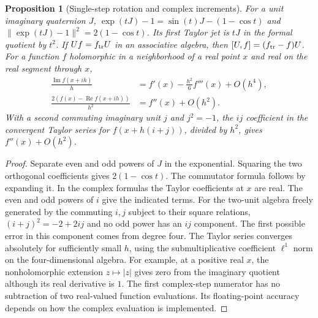 \documentclass[11pt,reqno]{amsart}
\newtheorem{proposition}[theorem]{Proposition}
\theoremstyle{definition}
\theoremstyle{remark}
\numberwithin{equation}{section}
\begin{document}
\begin{proposition}[Single-step rotation and complex increments]\label{m8:complex-step}
For a unit imaginary quaternion $J$,
$\exp(tJ)-1=\sin(t)J-(1-\cos t)$ and
$\|\exp(tJ)-1\|^2=2(1-\cos t)$. Its first Taylor jet is $tJ$
in the formal quotient by $t^2$. If $U f=f_{\rm tr}U$ in an
associative algebra, then $[U,f]=(f_{\rm tr}-f)U$.
For a function $f$ holomorphic in a neighborhood of a real point
$x$ and real on the real segment through $x$,
\begin{align*}
 \frac{\operatorname{Im}f(x+ih)}{h}
     &=f'(x)-\frac{h^2}{6}f'''(x)+O(h^4),\\
 \frac{2(f(x)-\operatorname{Re}f(x+ih))}{h^2}
     &=f''(x)+O(h^2).
\end{align*}
With a second commuting imaginary unit $j$ and $j^2=-1$,
the $ij$ coefficient in the convergent Taylor series for
$f(x+h(i+j))$, divided by $h^2$, gives $f''(x)+O(h^2)$.
\end{proposition}
\begin{proof}
Separate even and odd powers of $J$ in the exponential. Squaring
the two orthogonal coefficients gives $2(1-\cos t)$. The
commutator formula follows by expanding it. In the complex formulas
the Taylor coefficients at $x$ are real. The even and odd powers of
$i$ give the indicated terms. For the two-unit algebra freely
generated by the commuting $i,j$ subject to their square relations,
$(i+j)^2=-2+2ij$ and no odd power has an $ij$ component.
The first possible error in this component comes from degree four.
The Taylor series converges absolutely for sufficiently small $h$,
using the submultiplicative coefficient $\ell^1$ norm on the
four-dimensional algebra. For example, at a positive real $x$,
the nonholomorphic extension $z\mapsto |z|$ gives zero from the
imaginary quotient although its real derivative is $1$.
The first complex-step numerator has no subtraction of two
real-valued function evaluations. Its floating-point accuracy
depends on how the complex evaluation is implemented.
\end{proof}
\end{document}
